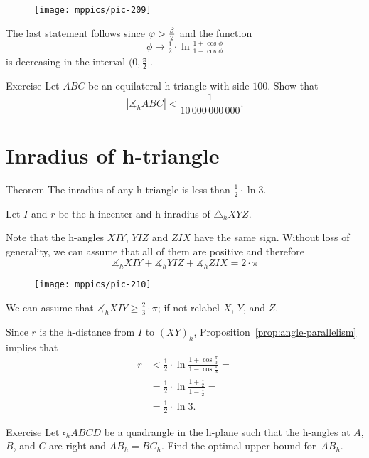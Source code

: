 \begin{wrapfigure}{o}{46mm}
\vskip-0mm
\centering
\texttt{[image: mppics/pic-209]}
\end{wrapfigure}

The last statement follows since $\phi\z>\tfrac\beta2$ and the function 
\[\phi\mapsto  \tfrac12\cdot\ln \tfrac{1+\cos\phi}{1-\cos\phi}\] 
is decreasing in the interval $(0,\tfrac\pi2]$.
\qeds

\begin{thm}{Exercise}\label{ex:small-angle}
Let $ABC$ be an equilateral h-triangle with side $100$.
Show that 
\[|\measuredangle_h ABC|<\frac1{10\,000\,000\,000}.\]
\end{thm}

\section*{Inradius of h-triangle}

\begin{thm}{Theorem}\label{thm:h-inradius}
The inradius of any h-triangle 
is less than $\tfrac12\cdot\ln3$.
\end{thm}

Let $I$ and $r$ be the h-incenter and h-inradius of $\triangle_hXYZ$.

Note that the h-angles 
$XIY$, 
$YIZ$ and 
$ZIX$
have the same sign.
Without loss of generality, we can assume that all of them are positive
and therefore
\[\measuredangle_hXIY+ 
\measuredangle_hYIZ+ 
\measuredangle_hZIX=2\cdot\pi
\]

{

\begin{wrapfigure}{o}{44mm}
\centering
\texttt{[image: mppics/pic-210]}
\end{wrapfigure}

We can assume that
$\measuredangle_hXIY\ge\tfrac23\cdot\pi$;
if not relabel $X$, $Y$, and $Z$. 

Since $r$ is the h-distance from $I$ to $(XY)_h$,
Proposition~\ref{prop:angle-parallelism} implies that
\begin{align*}r&<\tfrac12\cdot\ln \tfrac{1+\cos\frac\pi3}{1-\cos\frac\pi3}=
\\
&=\tfrac12\cdot\ln\frac{1+\tfrac12}{1-\tfrac12}=
\\
&=\tfrac12\cdot\ln 3.
\end{align*}
\qedsf

}

\begin{thm}{Exercise}\label{ex:side-sup}
Let $\square_h ABCD$ be a quadrangle in the h-plane 
such that the h-angles at $A$, $B$, and $C$ are right and $AB_h=BC_h$.
Find the optimal upper bound for~$AB_h$.
\end{thm}


